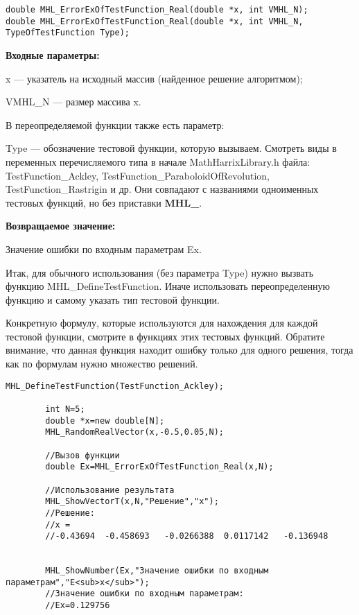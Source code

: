\documentclass[a4paper,12pt]{article}
\begin{document}
\begin{lstlisting}[label=code_syntax_MHL_ErrorExOfTestFunction_Real,caption=Синтаксис]
double MHL_ErrorExOfTestFunction_Real(double *x, int VMHL_N);
double MHL_ErrorExOfTestFunction_Real(double *x, int VMHL_N, TypeOfTestFunction Type);
\end{lstlisting}

\textbf{Входные параметры:}

x --- указатель на исходный массив (найденное решение алгоритмом);

VMHL\_N --- размер массива x.

В переопределяемой функции также есть параметр:
  
Type --- обозначение тестовой функции, которую вызываем.
Смотреть виды в переменных перечисляемого типа в начале MathHarrixLibrary.h файла: TestFunction\_Ackley, TestFunction\_ParaboloidOfRevolution, TestFunction\_Rastrigin и др. Они совпадают с названиями одноименных тестовых функций, но без приставки \textbf{MHL\_}.

\textbf{Возвращаемое значение:}
 
Значение ошибки по входным параметрам Ex.

Итак, для обычного использования (без параметра Type) нужно вызвать функцию MHL\_DefineTestFunction. Иначе использовать переопределенную функцию и самому указать тип тестовой функции.

Конкретную формулу, которые используются для нахождения для каждой тестовой функции, смотрите в функциях этих тестовых функций. Обратите внимание, что данная функция находит ошибку только для одного решения, тогда как по формулам нужно множество решений.


\begin{lstlisting}[label=code_use_MHL_ErrorExOfTestFunction_Real,caption=Пример использования]
        MHL_DefineTestFunction(TestFunction_Ackley);

        int N=5;
        double *x=new double[N];
        MHL_RandomRealVector(x,-0.5,0.05,N);

        //Вызов функции
        double Ex=MHL_ErrorExOfTestFunction_Real(x,N);

        //Использование результата
        MHL_ShowVectorT(x,N,"Решение","x");
        //Решение:
        //x =
        //-0.43694	-0.458693	-0.0266388	0.0117142	-0.136948


        MHL_ShowNumber(Ex,"Значение ошибки по входным параметрам","E<sub>x</sub>");
        //Значение ошибки по входным параметрам:
        //Ex=0.129756
\end{lstlisting}
\end{document}
